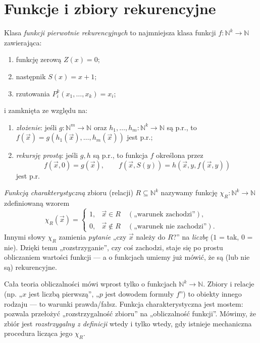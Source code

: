 \section{Funkcje i zbiory rekurencyjne}\label{sec:funkcje-rekurencyjne}
\begin{definicja}\label{res:5:1}
Klasa \emph{funkcji pierwotnie rekurencyjnych} to najmniejsza klasa funkcji $f:\mathbb N^k\to\mathbb N$ zawierająca:
\begin{enumerate}[label=(\roman*)]
\item funkcję zerową $Z(x)=0$;
\item następnik $S(x)=x+1$;
\item rzutowania $P_i^k(x_1,\ldots,x_k)=x_i$;
\end{enumerate}
i zamknięta ze względu na:
\begin{enumerate}[label=(\alph*)]
\item \emph{złożenie}: jeśli $g:\mathbb N^m\to\mathbb N$ oraz $h_1,\ldots,h_m:\mathbb N^k\to\mathbb N$ są p.r., to $f(\vec x)=g(h_1(\vec x),\ldots,h_m(\vec x))$ jest p.r.;
\item \emph{rekursję prostą}: jeśli $g,h$ są p.r., to funkcja $f$ określona przez
\[
f(\vec x,0)=g(\vec x),\qquad f(\vec x,S(y))=h(\vec x,y,f(\vec x,y))
\]
jest p.r.
\end{enumerate}
\end{definicja}

\begin{definicja}\label{res:5:2}
\emph{Funkcją charakterystyczną} zbioru (relacji) $R\subseteq\mathbb N^k$ nazywamy funkcję $\chi_R:\mathbb N^k\to\mathbb N$ zdefiniowaną wzorem
\[
\chi_R(\vec x)=\begin{cases}1,&\vec x\in R\quad(\text{„warunek zachodzi”}),\\0,&\vec x\notin R\quad(\text{„warunek nie zachodzi”}).\end{cases}
\]
Innymi słowy $\chi_R$ zamienia \emph{pytanie} „czy $\vec x$ należy do $R$?” na \emph{liczbę} ($1$ = tak, $0$ = nie). Dzięki temu „rozstrzyganie”, czy coś zachodzi, staje się po prostu obliczaniem wartości funkcji --- a o funkcjach umiemy już mówić, że są (lub nie są) rekurencyjne.
\end{definicja}

\begin{uwaga}\label{res:5:3}
Cała teoria obliczalności mówi wprost tylko o funkcjach $\mathbb N^k\to\mathbb N$. Zbiory i relacje (np. „$x$ jest liczbą pierwszą”, „$p$ jest dowodem formuły $f$”) to obiekty innego rodzaju --- to warunki prawda/fałsz. Funkcja charakterystyczna jest mostem: pozwala przełożyć „rozstrzygalność zbioru” na „obliczalność funkcji”. Mówimy, że zbiór jest \emph{rozstrzygalny z definicji} wtedy i tylko wtedy, gdy istnieje mechaniczna procedura licząca jego $\chi_R$.
\end{uwaga}

